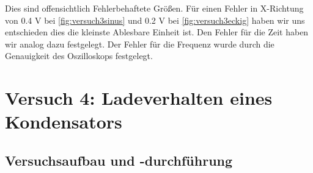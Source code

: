         Dies sind offensichtlich Fehlerbehaftete Größen. Für einen Fehler in X-Richtung von 0.4 V bei \ref{fig:versuch3sinus} und 0.2 V bei \ref{fig:versuch3eckig} haben wir uns entschieden dies die kleinste Ablesbare Einheit ist. Den Fehler für die Zeit haben wir analog dazu festgelegt. Der Fehler für die Frequenz wurde durch die Genauigkeit des Oszilloskops festgelegt.

\section{Versuch 4: Ladeverhalten eines Kondensators}

    \subsection{Versuchsaufbau und -durchführung}

